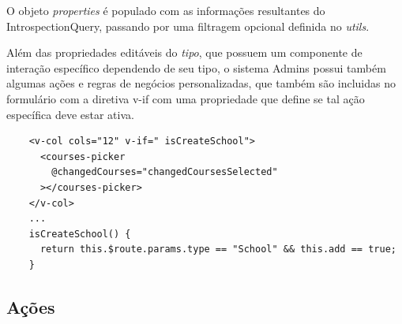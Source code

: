 O objeto \textit{properties} é populado com as informações resultantes do IntrospectionQuery, passando por uma filtragem opcional definida no \textit{utils}.

Além das propriedades editáveis do \textit{tipo}, que possuem um componente de interação específico dependendo de seu tipo, o sistema Admins possui também algumas ações e regras de negócios personalizadas, que também são incluidas no formulário com a diretiva v-if com uma propriedade que define se tal ação específica deve estar ativa.

\begin{lstlisting}
    <v-col cols="12" v-if=" isCreateSchool">
      <courses-picker
        @changedCourses="changedCoursesSelected"
      ></courses-picker>
    </v-col>
    ...
    isCreateSchool() {
      return this.$route.params.type == "School" && this.add == true;
    }
\end{lstlisting}


\subsection{Ações}

